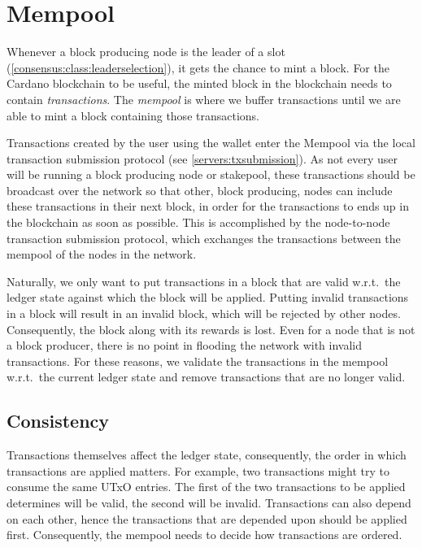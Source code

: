 \chapter{Mempool}
\label{mempool}

Whenever a block producing node is the leader of a slot
(\cref{consensus:class:leaderselection}), it gets the chance to mint a block.
For the Cardano blockchain to be useful, the minted block in the blockchain
needs to contain \emph{transactions}. The \emph{mempool} is where we buffer
transactions until we are able to mint a block containing those transactions.

Transactions created by the user using the wallet enter the Mempool via the
local transaction submission protocol (see \cref{servers:txsubmission}). As not
every user will be running a block producing node or stakepool, these
transactions should be broadcast over the network so that other, block
producing, nodes can include these transactions in their next block, in order
for the transactions to ends up in the blockchain as soon as possible. This is
accomplished by the node-to-node transaction submission protocol,
which exchanges the transactions between the mempool of the nodes in the
network.

Naturally, we only want to put transactions in a block that are valid
w.r.t.\ the ledger state against which the block will be applied. Putting
invalid transactions in a block will result in an invalid block, which will be
rejected by other nodes. Consequently, the block along with its rewards is lost.
Even for a node that is not a block producer, there is no point in flooding the
network with invalid transactions. For these reasons, we validate the
transactions in the mempool w.r.t.\ the current ledger state and remove
transactions that are no longer valid.

\section{Consistency}
\label{mempool:consistency}

Transactions themselves affect the ledger state, consequently, the order in
which transactions are applied matters. For example, two transactions might try
to consume the same UTxO entries. The first of the two transactions to be
applied determines will be valid, the second will be invalid. Transactions can
also depend on each other, hence the transactions that are depended upon should
be applied first. Consequently, the mempool needs to decide how transactions are
ordered.


